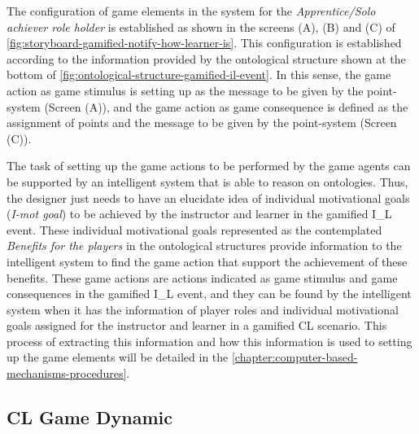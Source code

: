 The configuration of game elements in the system for the \emph{Apprentice/Solo achiever role holder }is established as shown in the screens (A), (B) and (C) of \autoref{fig:storyboard-gamified-notify-how-learner-is}.
This configuration is established according to the information provided by the ontological structure shown at the bottom of \autoref{fig:ontological-structure-gamified-il-event}.
In this sense, the game action  as game stimulus is setting up as the message  to be given by the point-system (Screen (A)), and the game action  as game consequence is defined as the assignment of points and the message to be given by the point-system (Screen (C)).

The task of setting up the game actions to be performed by the game agents can be supported by an intelligent system that is able to reason on ontologies.
Thus, the designer just needs to have an elucidate idea of individual motivational goals (\emph{I-mot goal}) to be achieved by the instructor and learner in the gamified I\_L event.
These individual motivational goals represented as the contemplated \emph{Benefits for the players} in the ontological structures provide information to the intelligent system to find the game action that support the achievement of these benefits.
These game actions are actions indicated as game stimulus and game consequences in the gamified I\_L event, and they can be found by the intelligent system when it has the information of player roles and individual motivational goals assigned for the instructor and learner in a gamified CL scenario.
This process of extracting this information and how this information is used to setting up the game elements will be detailed in the \autoref{chapter:computer-based-mechanisms-procedures}.

\subsection{CL Game Dynamic}
\label{subsec:cl-game-dynamic}

